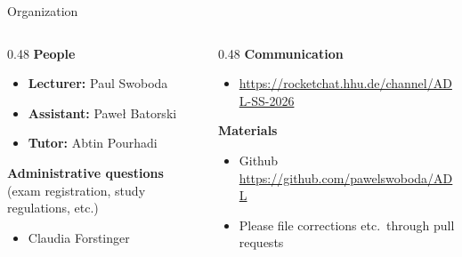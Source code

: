 \begin{frame}{Organization}
  \begin{columns}
    \begin{column}{0.48\textwidth}
      \textbf{People}
      \begin{itemize}
        \item \textbf{Lecturer:} Paul Swoboda \\
            {\small{}}
        \item \textbf{Assistant:} Pawe\l{} Batorski \\
            {\small{}}
        \item \textbf{Tutor:} Abtin Pourhadi \\
            {\small{}}
      \end{itemize}

      \vspace{0.8em}
      \textbf{Administrative questions} \\
      (exam registration, study regulations, etc.)
      \begin{itemize}
        \item Claudia Forstinger \\
          \small{}
      \end{itemize}
    \end{column}
    \begin{column}{0.48\textwidth}
      \textbf{Communication}
      \begin{itemize}
          \item \url{https://rocketchat.hhu.de/channel/ADL-SS-2026}
      \end{itemize}

      \vspace{0.8em}
      \textbf{Materials}
      \begin{itemize}
        \item Github \\
            {\small\textcolor{red}{\url{https://github.com/pawelswoboda/ADL}}}
	\item Please file corrections etc.\ through pull requests
      \end{itemize}

    \end{column}
  \end{columns}
\end{frame}

